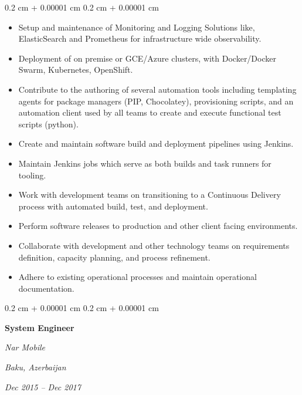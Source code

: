 \documentclass[10pt, letterpaper]{article}
\newenvironment{highlights}{
  \begin{itemize}[
        topsep=0.10 cm,
        parsep=0.10 cm,
        partopsep=0pt,
        itemsep=0pt,
        leftmargin=0.4 cm + 10pt
      ]
    }{
  \end{itemize}
} %
\newenvironment{onecolentry}{
  \begin{adjustwidth}{
      0.2 cm + 0.00001 cm
    }{
      0.2 cm + 0.00001 cm
    }
  }{
  \end{adjustwidth}
} %
\newenvironment{twocolentry}[2][]{
  \onecolentry
  \def\secondColumn{#2}
  \setcolumnwidth{\fill, 4.5 cm}
  \begin{paracol}{2}
  }{
    \switchcolumn \raggedleft \secondColumn
  \end{paracol}
  \endonecolentry
} %
\begin{document}
\vspace{0.2 cm}
\begin{onecolentry}
  \begin{highlights}
  \item Setup and maintenance of Monitoring and Logging Solutions
    like, ElasticSearch and Prometheus for infrastructure wide observability.
  \item Deployment of on premise or GCE/Azure clusters, with
    Docker/Docker Swarm, Kubernetes, OpenShift.
  \item Contribute to the authoring of several automation tools
    including templating agents for package managers (PIP,
    Chocolatey), provisioning scripts, and an automation client used
    by all teams to create and execute functional test scripts (python).
  \item Create and maintain software build and deployment pipelines
    using Jenkins.
  \item Maintain Jenkins jobs which serve as both builds and task
    runners for tooling.
  \item Work with development teams on transitioning to a Continuous
    Delivery process with automated build, test, and deployment.
  \item Perform software releases to production and other client
    facing environments.
  \item Collaborate with development and other technology teams on
    requirements definition, capacity planning, and process refinement.
  \item Adhere to existing operational processes and maintain
    operational documentation.
  \end{highlights}
\end{onecolentry}

\vspace{0.3 cm}

\begin{twocolentry}{
    \textit{Baku, Azerbaijan}

  \textit{Dec 2015 – Dec 2017}}
  \textbf{System Engineer}

  \textit{Nar Mobile}
\end{twocolentry}
\end{document}

